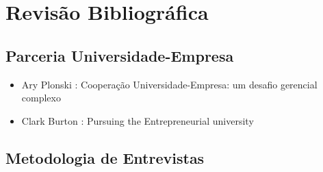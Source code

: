 \chapter[Revisão Bibliográfica]{Revisão Bibliográfica}
\label{chap:revisao}

\section{Parceria Universidade-Empresa}
\label{cha:ensino}
\begin{itemize}
\item Ary Plonski : Cooperação Universidade-Empresa: um desafio gerencial complexo
\item Clark Burton : Pursuing the Entrepreneurial university
\end{itemize}

\section{Metodologia de Entrevistas}
\label{cha:ensino}

